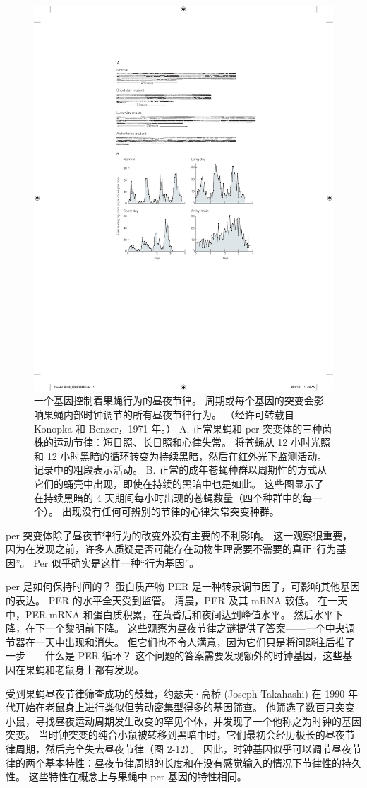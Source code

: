 \begin{figure}[htbp]
	\centering
	\includegraphics[width=0.5\linewidth]{chap02/fig_2_11}
	\caption{一个基因控制着果蝇行为的昼夜节律。 周期或每个基因的突变会影响果蝇内部时钟调节的所有昼夜节律行为。 
		（经许可转载自 Konopka 和 Benzer，1971 年。）
		A. 正常果蝇和 per 突变体的三种菌株的运动节律：短日照、长日照和心律失常。 将苍蝇从 12 小时光照和 12 小时黑暗的循环转变为持续黑暗，然后在红外光下监测活动。 记录中的粗段表示活动。 
		B. 正常的成年苍蝇种群以周期性的方式从它们的蛹壳中出现，即使在持续的黑暗中也是如此。 这些图显示了在持续黑暗的 4 天期间每小时出现的苍蝇数量（四个种群中的每一个）。
		出现没有任何可辨别的节律的心律失常突变种群。}
	\label{fig:2_11}
\end{figure}


per 突变体除了昼夜节律行为的改变外没有主要的不利影响。 
这一观察很重要，因为在发现之前，许多人质疑是否可能存在动物生理需要不需要的真正“行为基因”。 
Per 似乎确实是这样一种“行为基因”。


per 是如何保持时间的？ 
蛋白质产物 PER 是一种转录调节因子，可影响其他基因的表达。 
PER 的水平全天受到监管。 
清晨，PER 及其 mRNA 较低。 
在一天中，PER mRNA 和蛋白质积累，在黄昏后和夜间达到峰值水平。 
然后水平下降，在下一个黎明前下降。 
这些观察为昼夜节律之谜提供了答案——一个中央调节器在一天中出现和消失。 
但它们也不令人满意，因为它们只是将问题往后推了一步——什么是 PER 循环？ 
这个问题的答案需要发现额外的时钟基因，这些基因在果蝇和老鼠身上都有发现。


受到果蝇昼夜节律筛查成功的鼓舞，约瑟夫·高桥 (Joseph Takahashi) 在 1990 年代开始在老鼠身上进行类似但劳动密集型得多的基因筛查。 
他筛选了数百只突变小鼠，寻找昼夜运动周期发生改变的罕见个体，并发现了一个他称之为时钟的基因突变。 
当时钟突变的纯合小鼠被转移到黑暗中时，它们最初会经历极长的昼夜节律周期，然后完全失去昼夜节律（图 2-12）。 
因此，时钟基因似乎可以调节昼夜节律的两个基本特性：昼夜节律周期的长度和在没有感觉输入的情况下节律性的持久性。 
这些特性在概念上与果蝇中 per 基因的特性相同。


